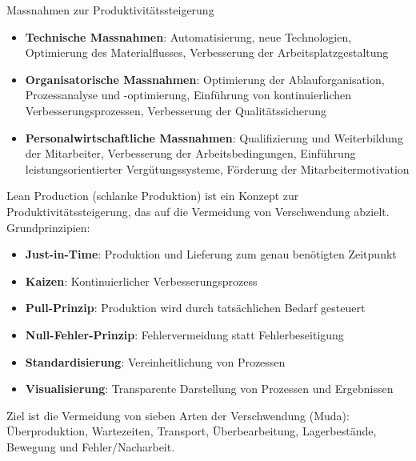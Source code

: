 \begin{definition}{Massnahmen zur Produktivitätssteigerung}
\begin{itemize}
    \item \textbf{Technische Massnahmen}: Automatisierung, neue Technologien, Optimierung des Materialflusses, Verbesserung der Arbeitsplatzgestaltung
    \item \textbf{Organisatorische Massnahmen}: Optimierung der Ablauforganisation, Prozessanalyse und -optimierung, Einführung von kontinuierlichen Verbesserungsprozessen, Verbesserung der Qualitätssicherung
    \item \textbf{Personalwirtschaftliche Massnahmen}: Qualifizierung und Weiterbildung der Mitarbeiter, Verbesserung der Arbeitsbedingungen, Einführung leistungsorientierter Vergütungssysteme, Förderung der Mitarbeitermotivation
\end{itemize}
\end{definition}

\begin{concept}{Lean Production} (schlanke Produktion) ist ein Konzept zur Produktivitätssteigerung, das auf die Vermeidung von Verschwendung abzielt. Grundprinzipien:
\begin{itemize}
    \item \textbf{Just-in-Time}: Produktion und Lieferung zum genau benötigten Zeitpunkt
    \item \textbf{Kaizen}: Kontinuierlicher Verbesserungsprozess
    \item \textbf{Pull-Prinzip}: Produktion wird durch tatsächlichen Bedarf gesteuert
    \item \textbf{Null-Fehler-Prinzip}: Fehlervermeidung statt Fehlerbeseitigung
    \item \textbf{Standardisierung}: Vereinheitlichung von Prozessen
    \item \textbf{Visualisierung}: Transparente Darstellung von Prozessen und Ergebnissen
\end{itemize}

Ziel ist die Vermeidung von sieben Arten der Verschwendung (Muda):
Überproduktion, Wartezeiten, Transport, Überbearbeitung, Lagerbestände, Bewegung und Fehler/Nacharbeit.
\end{concept}
